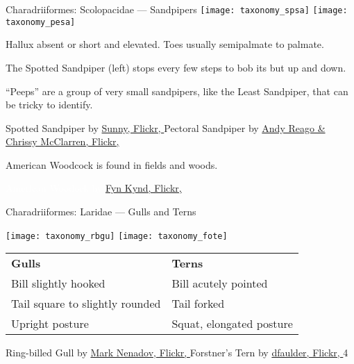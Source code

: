 \documentclass[t]{beamer}
\begin{document}
%


\begin{frame}{Charadriiformes: Scolopacidae — Sandpipers}
\texttt{[image: taxonomy\_spsa]} \hfill \texttt{[image: taxonomy\_pesa]}

Hallux absent or short and elevated. Toes usually semipalmate to palmate.

\vspace{\baselineskip}

The Spotted Sandpiper (left) stops every few steps to bob its but up and down.

\vspace{\baselineskip}

“Peeps” are a group of very small sandpipers, like the Least Sandpiper, that can be tricky to identify.


\vfilll

\tiny Spotted Sandpiper by \href{https://flickr.com/photos/airboy123/26032281188}{Sunny, Flickr, }\hfill Pectoral Sandpiper by  \href{https://flickr.com/photos/wildreturn/46104489551}{Andy Reago \& Chrissy McClarren, Flickr, }

\end{frame}

{
\begin{frame}[t]{American Woodcock is found in fields and woods.}

	\tinyfill \textcolor{white}{American Woodock by  \href{https://www.flickr.com/photos/79452129@N02/15728605426}{Fyn Kynd, Flickr, }}
\end{frame}
}


\begin{frame}{Charadriiformes: Laridae — Gulls and Terns}

\texttt{[image: taxonomy\_rbgu]}\hfill
\texttt{[image: taxonomy\_fote]}

\begin{tabular}{L{5.7cm}L{6cm}}
\textbf{Gulls}	& \textbf{Terns} \tabularnewline
Bill slightly hooked & Bill acutely pointed \tabularnewline
Tail square to slightly rounded & Tail forked\tabularnewline
Upright posture & 	Squat, elongated posture\tabularnewline
\end{tabular}


\vfilll

\tiny Ring-billed Gull by \href{https://flickr.com/photos/marknenadov/33299083036}{Mark Nenadov, Flickr, } \hfill
Forstner's Tern by \href{https://flickr.com/photos/dfaulder/35770210905}{dfaulder, Flickr, }
4\end{frame}
\end{document}
